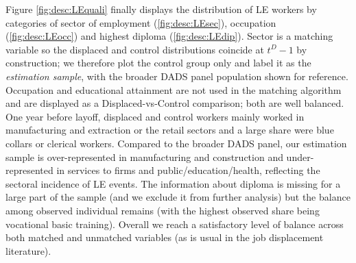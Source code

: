 Figure \ref{fig:desc:LEquali} finally displays the distribution of LE workers by categories of sector of employment (\ref{fig:desc:LEsec}), occupation (\ref{fig:desc:LEocc}) and highest diploma (\ref{fig:desc:LEdip}). Sector is a matching variable so the displaced and control distributions coincide at $t^D-1$ by construction; we therefore plot the control group only and label it as the \textit{estimation sample}, with the broader DADS panel population shown for reference. Occupation and educational attainment are not used in the matching algorithm and are displayed as a Displaced-vs-Control comparison; both are well balanced. One year before layoff, displaced and control workers mainly worked in manufacturing and extraction or the retail sectors and a large share were blue collars or clerical workers. Compared to the broader DADS panel, our estimation sample is over-represented in manufacturing and construction and under-represented in services to firms and public/education/health, reflecting the sectoral incidence of LE events. %
The information about diploma is missing for a large part of the sample (and we exclude it from further analysis) but the balance among observed individual remains (with the highest observed share being vocational basic training). Overall we reach a satisfactory level of balance across both matched and unmatched variables (as is usual in the job displacement literature).  


